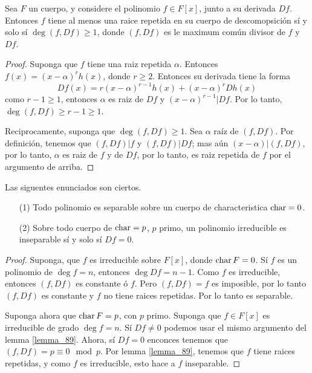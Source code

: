 \begin{lemma}\label{lemma_89}
    Sea $F$ un cuerpo, y considere el polinomio  $f \in F[x]$, junto a su
    derivada $D{f}$. Entonces $f$ tiene al menos una raice repetida en su cuerpo
    de descomopsici\'on s\'i y solo s\'i  $\deg{(f,D{f})} \geq 1$, donde
    $(f,D{f})$ es le maximum com\'un divisor de $f$ y $D{f}$.
\end{lemma}
\begin{proof}
    Suponga que $f$ tiene una raiz repetida  $\alpha$. Entonces
    $f(x)=(x-\alpha)^rh(x)$, donde $r \geq 2$. Entonces su derivada tiene la
    forma
    \begin{equation*}
        D{f}(x)=r(x-\alpha)^{r-1}h(x)+(x-\alpha)^rD{h}(x)
    \end{equation*}
    como $r-1 \geq 1$, entonces $\alpha$ es raiz de $D{f}$ y
    $(x-\alpha)^{r-1}|D{f}$. Por lo tanto, $\deg{(f,D{f})} \geq r-1 \geq 1$.

    Reciprocamente, suponga que $\deg{(f,D{f})} \geq 1$. Sea $\alpha$ ra\'iz de
    $(f,D{f})$. Por definici\'on, tenemos que $(f,D{f})|f$ y $(f,D{f})|D{f}$;
    mas a\'un $(x-\alpha)|(f,D{f})$, por lo tanto, $\alpha$ es raiz de  $f$ y de
     $D{f}$, por lo tanto, es raiz repetida de $f$ por el argumento de arriba.
\end{proof}
\begin{corollary}
    Las siguentes enunciados son ciertos.
    \begin{enumerate}
        \item[(1)] Todo polinomio es separable sobre un cuerpo de
            characteristica $\operatorname{char}=0$.

        \item[(2)] Sobre todo cuerpo de $\operatorname{char}=p$,  $p$ primo, un polinomio
            irreducible es inseparable s\'i y solo s\'i $D{f}=0$.
    \end{enumerate}
\end{corollary}
\begin{proof}
    Suponga, que $f$ es irreducible sobre  $F[x]$, donde $\operatorname{char}{F}=0$. S\'i $f$
    es un polinomio de  $\deg{f}=n$, entonces $\deg{D{f}}=n-1$. Como $f$ es
    irreducible, entonces  $(f,D{f})$ es constante \'o  $f$. Pero $(f,D{f})=f$
    es imposible, por lo tanto $(f,D{f})$ es constante y $f$ no tiene raices
    repetidas. Por lo tanto es separable.

    Suponga ahora que  $\operatorname{char}{F}=p$, con $p$ primo. Suponga que $f \in F[x]$ es
    irreducible de grado $\deg{f}=n$. S\'i $D{f} \neq 0$ podemos usar el mismo
    argumento del lemma \ref{lemma_89}. Ahora, s\'i $D{f}=0$ enconces tenemos
    que $(f,D{f})=p \equiv 0 \mod{p}$. Por lemma \ref{lemma_89}, tenemos que $f$
    tiene raices repetidas, y como  $f$ es irreducible, esto hace a  $f$
    inseparable.
\end{proof}

